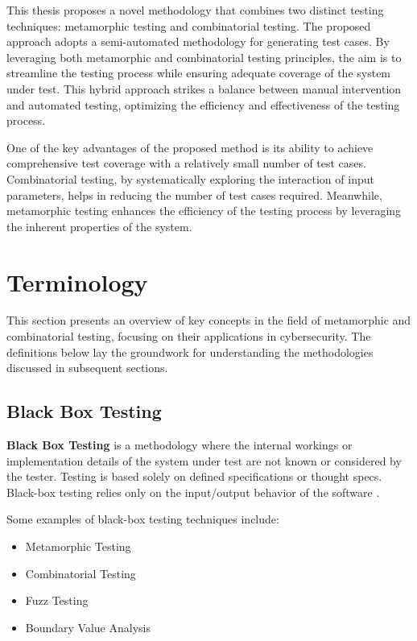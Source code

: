 This thesis proposes a novel methodology that combines two distinct testing techniques: metamorphic testing and combinatorial testing. The proposed approach adopts a semi-automated methodology for generating test cases. By leveraging both metamorphic and combinatorial testing principles, the aim is to streamline the testing process while ensuring adequate coverage of the system under test. This hybrid approach strikes a balance between manual intervention and automated testing, optimizing the efficiency and effectiveness of the testing process.

One of the key advantages of the proposed method is its ability to achieve comprehensive test coverage with a relatively small number of test cases. Combinatorial testing, by systematically exploring the interaction of input parameters, helps in reducing the number of test cases required. Meanwhile, metamorphic testing enhances the efficiency of the testing process by leveraging the inherent properties of the system.

\section{Terminology}

This section presents an overview of key concepts in the field of metamorphic and combinatorial testing, focusing on their applications in cybersecurity. The definitions below lay the groundwork for understanding the methodologies discussed in subsequent sections.

\subsection{Black Box Testing}

\textbf{Black Box Testing} is a methodology where the internal workings or implementation details of the system under test are not known or considered by the tester. Testing is based solely on defined specifications or thought specs. Black-box testing relies only on the input/output behavior of the software \cite{Testing}.

Some examples of black-box testing techniques include:
\begin{itemize}
    \item Metamorphic Testing
    \item Combinatorial Testing
    \item Fuzz Testing
    \item Boundary Value Analysis
\end{itemize}

